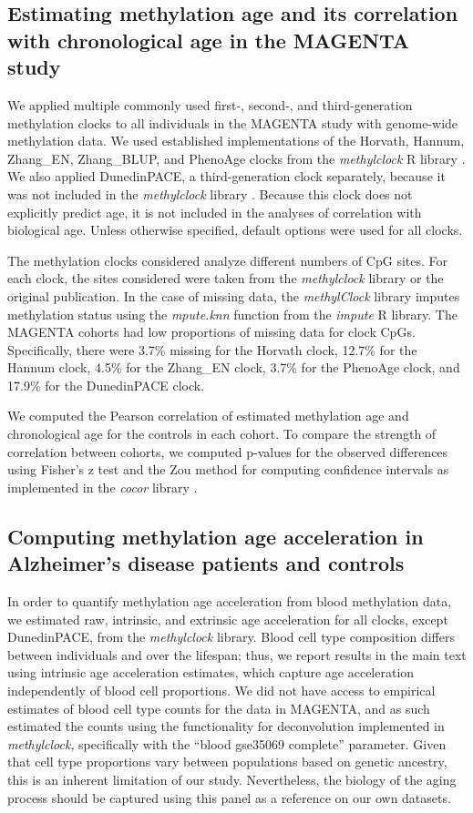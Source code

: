 \subsection{Estimating methylation age and its correlation with chronological age in the MAGENTA study}
We applied multiple commonly used first-, second-, and third-generation methylation clocks to all individuals in the MAGENTA study with genome-wide methylation data. We used established implementations of the Horvath, Hannum, Zhang\_EN, Zhang\_BLUP, and PhenoAge clocks from the \textit{methylclock} R library \citep{pelegi-siso_methylclock_2021}. We also applied DunedinPACE, a third-generation clock separately, because it was not included in the \textit{methylclock} library \citep{belsky_dunedinpace_2022}. Because this clock does not explicitly predict age, it is not included in the analyses of correlation with biological age. Unless otherwise specified, default options were used for all clocks.

The methylation clocks considered analyze different numbers of CpG sites. For each clock, the sites considered were taken from the \textit{methylclock} library or the original publication. In the case of missing data, the \textit{methylClock} library imputes methylation status using the \textit{mpute.knn} function from the \textit{impute} R library. The MAGENTA cohorts had low proportions of missing data for clock CpGs. Specifically, there were 3.7\% missing for the Horvath clock, 12.7\% for the Hannum clock, 4.5\% for the Zhang\_EN clock, 3.7\% for the PhenoAge clock, and 17.9\% for the DunedinPACE clock.

We computed the Pearson correlation of estimated methylation age and chronological age for the controls in each cohort. To compare the strength of correlation between cohorts, we computed p-values for the observed differences using Fisher's z test and the Zou method for computing confidence intervals as implemented in the \textit{cocor} library \citep{diedenhofen_cocor_2015}. 

\subsection{Computing methylation age acceleration in Alzheimer's disease patients and controls}
In order to quantify methylation age acceleration from blood methylation data, we estimated raw, intrinsic, and extrinsic age acceleration for all clocks, except DunedinPACE, from the \textit{methylclock} library. Blood cell type composition differs between individuals and over the lifespan; thus, we report results in the main text using intrinsic age acceleration estimates, which capture age acceleration independently of blood cell proportions. We did not have access to empirical estimates of blood cell type counts for the data in MAGENTA, and as such estimated the counts using the functionality for deconvolution implemented in \textit{methylclock}, specifically with the ``blood gse35069 complete'' parameter. Given that cell type proportions vary between populations based on genetic ancestry, this is an inherent limitation of our study. Nevertheless, the biology of the aging process should be captured using this panel as a reference on our own datasets.

